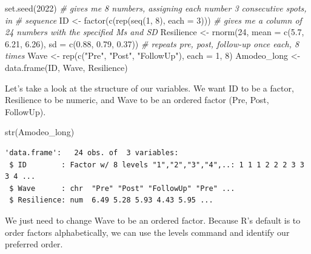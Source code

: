 \documentclass[
  11pt,
]{book}
\newenvironment{Shaded}{\begin{snugshade}}{\end{snugshade}}
\newcommand{\AttributeTok}[1]{\textcolor[rgb]{0.77,0.63,0.00}{#1}}
\newcommand{\CommentTok}[1]{\textcolor[rgb]{0.56,0.35,0.01}{\textit{#1}}}
\newcommand{\DecValTok}[1]{\textcolor[rgb]{0.00,0.00,0.81}{#1}}
\newcommand{\FloatTok}[1]{\textcolor[rgb]{0.00,0.00,0.81}{#1}}
\newcommand{\FunctionTok}[1]{\textcolor[rgb]{0.00,0.00,0.00}{#1}}
\newcommand{\NormalTok}[1]{#1}
\newcommand{\OtherTok}[1]{\textcolor[rgb]{0.56,0.35,0.01}{#1}}
\newcommand{\StringTok}[1]{\textcolor[rgb]{0.31,0.60,0.02}{#1}}
\begin{document}
\begin{Shaded}
\begin{Highlighting}[]
\FunctionTok{set.seed}\NormalTok{(}\DecValTok{2022}\NormalTok{)}
\CommentTok{\# gives me 8 numbers, assigning each number 3 consecutive spots, in}
\CommentTok{\# sequence}
\NormalTok{ID }\OtherTok{\textless{}{-}} \FunctionTok{factor}\NormalTok{(}\FunctionTok{c}\NormalTok{(}\FunctionTok{rep}\NormalTok{(}\FunctionTok{seq}\NormalTok{(}\DecValTok{1}\NormalTok{, }\DecValTok{8}\NormalTok{), }\AttributeTok{each =} \DecValTok{3}\NormalTok{)))}
\CommentTok{\# gives me a column of 24 numbers with the specified Ms and SD}
\NormalTok{Resilience }\OtherTok{\textless{}{-}} \FunctionTok{rnorm}\NormalTok{(}\DecValTok{24}\NormalTok{, }\AttributeTok{mean =} \FunctionTok{c}\NormalTok{(}\FloatTok{5.7}\NormalTok{, }\FloatTok{6.21}\NormalTok{, }\FloatTok{6.26}\NormalTok{), }\AttributeTok{sd =} \FunctionTok{c}\NormalTok{(}\FloatTok{0.88}\NormalTok{, }\FloatTok{0.79}\NormalTok{, }\FloatTok{0.37}\NormalTok{))}
\CommentTok{\# repeats pre, post, follow{-}up once each, 8 times}
\NormalTok{Wave }\OtherTok{\textless{}{-}} \FunctionTok{rep}\NormalTok{(}\FunctionTok{c}\NormalTok{(}\StringTok{"Pre"}\NormalTok{, }\StringTok{"Post"}\NormalTok{, }\StringTok{"FollowUp"}\NormalTok{), }\AttributeTok{each =} \DecValTok{1}\NormalTok{, }\DecValTok{8}\NormalTok{)}
\NormalTok{Amodeo\_long }\OtherTok{\textless{}{-}} \FunctionTok{data.frame}\NormalTok{(ID, Wave, Resilience)}
\end{Highlighting}
\end{Shaded}

Let's take a look at the structure of our variables. We want ID to be a factor, Resilience to be numeric, and Wave to be an ordered factor (Pre, Post, FollowUp).

\begin{Shaded}
\begin{Highlighting}[]
\FunctionTok{str}\NormalTok{(Amodeo\_long)}
\end{Highlighting}
\end{Shaded}

\begin{verbatim}
'data.frame':   24 obs. of  3 variables:
 $ ID        : Factor w/ 8 levels "1","2","3","4",..: 1 1 1 2 2 2 3 3 3 4 ...
 $ Wave      : chr  "Pre" "Post" "FollowUp" "Pre" ...
 $ Resilience: num  6.49 5.28 5.93 4.43 5.95 ...
\end{verbatim}

We just need to change Wave to be an ordered factor. Because R's default is to order factors alphabetically, we can use the levels command and identify our preferred order.
\end{document}
